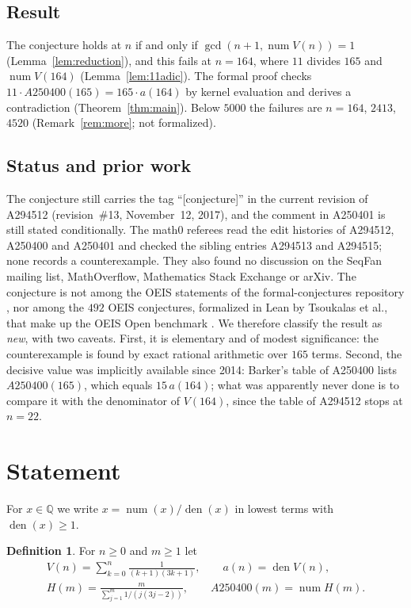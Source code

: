 \documentclass[11pt]{amsart}
\theoremstyle{plain}
\theoremstyle{definition}
\newtheorem{definition}[theorem]{Definition}
\newcommand{\Q}{\mathbb{Q}}
\DeclareMathOperator{\num}{num}
\DeclareMathOperator{\den}{den}
\begin{document}
\subsection*{Result}
The conjecture holds at $n$ if and only if $\gcd(n+1,\num V(n))=1$ (Lemma~\ref{lem:reduction}), and this fails at $n=164$, where $11$ divides $165$ and $\num V(164)$ (Lemma~\ref{lem:11adic}). The formal proof checks $11\cdot A250400(165)=165\cdot a(164)$ by kernel evaluation and derives a contradiction (Theorem~\ref{thm:main}). Below $5000$ the failures are $n=164$, $2413$, $4520$ (Remark~\ref{rem:more}; not formalized).

\subsection*{Status and prior work}
The conjecture still carries the tag ``[conjecture]'' in the current revision of A294512 (revision~\#13, November~12, 2017), and the comment in A250401 is still stated conditionally.
The math0 referees read the edit histories of A294512, A250400 and A250401 and checked the sibling entries A294513 and A294515; none records a counterexample.
They also found no discussion on the SeqFan mailing list, MathOverflow, Mathematics Stack Exchange or arXiv.
The conjecture is not among the OEIS statements of the formal-conjectures repository \cite{FC}, nor among the $492$ OEIS conjectures, formalized in Lean by Tsoukalas et al., that make up the OEIS Open benchmark \cite{Ad}.
We therefore classify the result as \emph{new}, with two caveats.
First, it is elementary and of modest significance: the counterexample is found by exact rational arithmetic over $165$ terms.
Second, the decisive value was implicitly available since 2014: Barker's table of A250400 \cite{A250400} lists $A250400(165)$, which equals $15\,a(164)$; what was apparently never done is to compare it with the denominator of $V(164)$, since the table of A294512 stops at $n=22$.

\section{Statement}\label{sec:statement}

For $x\in\Q$ we write $x=\num(x)/\den(x)$ in lowest terms with $\den(x)\ge 1$.

\begin{definition}\label{def:main}
For $n\ge 0$ and $m\ge 1$ let
\begin{gather*}
  V(n)=\sum_{k=0}^{n}\frac{1}{(k+1)(3k+1)},\qquad a(n)=\den V(n),\\
  H(m)=\frac{m}{\sum_{j=1}^{m}1/(j(3j-2))},\qquad A250400(m)=\num H(m).
\end{gather*}
\end{definition}
\end{document}
